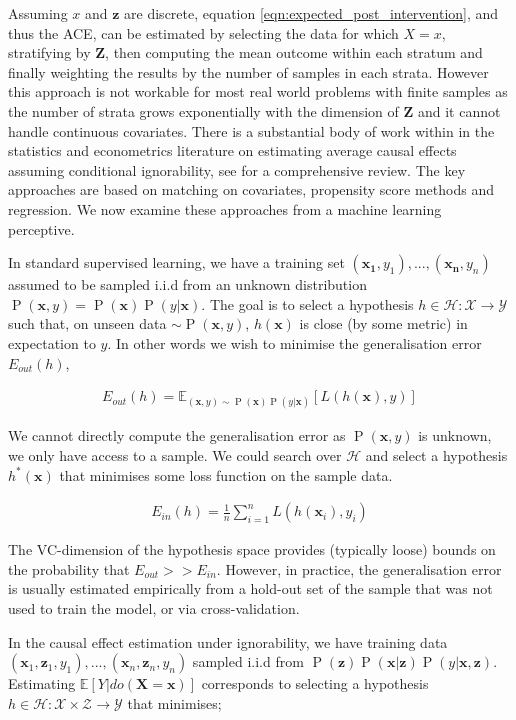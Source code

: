 \documentclass[11pt,a4paper,oneside]{book}
\newcommand{\vb}[1]{\boldsymbol{#1}}
\newcommand{\Esub}[2]{\mathbb E_{#1}\left[{#2}\right]}
\newcommand{\E}[1]{\mathbb E\left[{#1}\right]}
\newcommand{\eqn}[1]{\begin{align}#1\end{align}}
\renewcommand{\P}[1]{\operatorname{P}\left(#1\right)}
\theoremstyle{plain}
\theoremstyle{definition}
\begin{document}
Assuming $x$ and $\vb{z}$ are discrete, equation \ref{eqn:expected_post_intervention}, and thus the ACE, can be estimated by selecting the data for which $X=x$, stratifying by $\vb{Z}$, then computing the mean outcome within each stratum and finally weighting the results by the number of samples in each strata. However this approach is not workable for most real world problems with finite samples as the number of strata grows exponentially with the dimension of $\vb{Z}$ and it cannot handle continuous covariates. There is a substantial body of work within in the statistics and econometrics literature on estimating average causal effects assuming conditional ignorability, see \citet{Imbens2004} for a comprehensive review. The key approaches are based on matching on covariates, propensity score methods and regression. We now examine these approaches from a machine learning perceptive. 

In standard supervised learning, we have a training set $(\vb{x_1},y_1),...,(\vb{x_n},y_n)$ assumed to be sampled i.i.d from an unknown distribution $\P{\vb{x},y} =\P{\vb{x}}\P{y|\vb{x}}$. The goal is to select a hypothesis $h \in \mathcal{H} : \mathcal{X} \rightarrow \mathcal{Y}$ such that, on unseen data $ \sim \P{\vb{x},y}$, $h(\vb{x})$ is close (by some metric) in expectation to $y$. In other words we wish to minimise the generalisation error $E_{out}(h)$,

\eqn{
E_{out}(h) = \Esub{(\vb{x},y)\sim \P{\vb{x}}\P{y|\vb{x}}}{L(h(\vb{x}),y)}
}

We cannot directly compute the generalisation error as $\P{\vb{x},y}$ is unknown, we only have access to a sample. We could search over $\mathcal{H}$ and select a hypothesis $h^*(\vb{x})$ that minimises some loss function on the sample data.

\eqn{
E_{in}(h) = \frac{1}{n}\sum_{i=1}^n L(h(\vb{x}_i),y_i)
}

The VC-dimension of the hypothesis space provides (typically loose) bounds on the probability that $E_{out} >> E_{in}$. However, in practice, the generalisation error is usually estimated empirically from a hold-out set of the sample that was not used to train the model, or via cross-validation. 

In the causal effect estimation under ignorability, we have training data $(\vb{x}_1,\vb{z}_1,y_1),...,(\vb{x}_n,\vb{z}_n,y_n)$ sampled i.i.d from $\P{\vb{z}}\P{\vb{x}|\vb{z}}\P{y|\vb{x},\vb{z}}$. Estimating $\E{Y|do(\vb{X}=\vb{x})}$ corresponds to selecting a hypothesis $h \in \mathcal{H}:\mathcal{X} \times \mathcal{Z} \rightarrow \mathcal{Y}$ that minimises;
\end{document}
